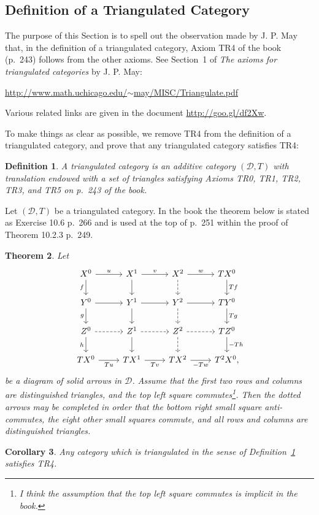 \documentclass[12pt]{article}%
\newtheorem{thm}{Theorem}%
\newtheorem{cor}[thm]{Corollary}
\newtheorem{df}[thm]{Definition}%
\theoremstyle{remark}
\theoremstyle{definition}
\newcommand{\cc}{\mathcal}
\begin{document}
\subsection{Definition of a Triangulated Category}

The purpose of this Section is to spell out the observation made by J. P. May that, in the definition of a triangulated category, Axiom TR4 of the book (p.~243) follows from the other axioms. See Section~1 of {\em The axioms for triangulated categories} by J. P. May:  
%
\begin{center}\href{http://www.math.uchicago.edu/~may/MISC/Triangulate.pdf}{http://www.math.uchicago.edu/$\sim$may/MISC/Triangulate.pdf} 
\end{center}
%
Various related links are given in the document \href{http://goo.gl/df2Xw}{http://goo.gl/df2Xw}. 

To make things as clear as possible, we remove TR4 from the definition of a triangulated category, and prove that any triangulated category satisfies TR4:
%
\begin{df}\label{tr}
A {\em triangulated category} is an additive category $(\cc D,T)$ with translation endowed with a set of triangles satisfying Axioms {\em TR0, TR1, TR2, TR3}, and {\em TR5} on p.~243 of the book.
\end{df}
%
Let $(\cc D,T)$ be a triangulated category. In the book the theorem below is stated as Exercise 10.6 p.~266 and is used at the top of p.~251 within the proof of Theorem 10.2.3 p.~249.
%
\begin{thm}\label{mayt}
Let 
$$
\begin{tikzcd}
X^0\ar{r}{u}\ar{d}[swap]{f}&X^1\ar{d}\ar{r}{v}&X^2\ar[dashed]{d}\ar{r}{w}&TX^0\ar{d}{Tf}\\ 
Y^0\ar{r}\ar{d}[swap]{g}&Y^1\ar{d}\ar{r}&Y^2\ar[dashed]{d}\ar{r}&TY^0\ar{d}{Tg}\\ 
Z^0\ar[dashed]{r}\ar{d}[swap]{h}&Z^1\ar{d}\ar[dashed]{r}&Z^2\ar[dashed]{d}\ar[dashed]{r}&TZ^0\ar{d}{-Th}\\ 
TX^0\ar{r}[swap]{Tu}&TX^1\ar{r}[swap]{Tv}&TX^2\ar{r}[swap]{-Tw}&T^2X^0,
\end{tikzcd}
$$ 
be a diagram of solid arrows in $\cc D$. Assume that the first two rows and columns are distinguished triangles, and the top left square commutes\footnote{I think the assumption that the top left square commutes is implicit in the book.}. Then the dotted arrows may be completed in order that the bottom right small square anti-commutes, the eight other small squares commute, and all rows and columns are distinguished triangles. 
\end{thm}
%
\begin{cor}\label{may}
Any category which is triangulated in the sense of Definition~\ref{tr} satisfies {\em TR4}.
\end{cor} 
\end{document}
